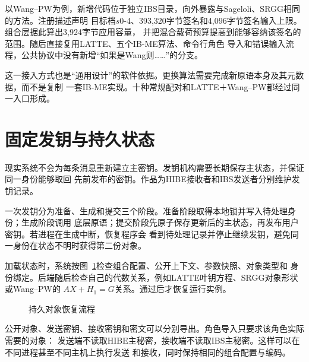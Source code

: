 以Wang--PW为例，新增代码位于独立IBS目录，向外暴露与Sageloli、SRGG相同的方法。注册描述声明
目标档$s0$-4、393,320字节签名和4,096字节签名输入上限。组合层据此算出3,924字节应用容量，
并把混合载荷预算提高到能够容纳该签名的范围。随后直接复用LATTE、五个IB-ME算法、命令行角色
导入和错误输入流程，公共协议中没有新增“如果是Wang则……”的分支。

这一接入方式也是“通用设计”的软件依据。更换算法需要完成新原语本身及其元数据，而不是复制
一套IB-ME实现。十种常规配对和LATTE＋Wang--PW都经过同一入口形成。

\section{固定发钥与持久状态}

现实系统不会为每条消息重新建立主密钥。发钥机构需要长期保存主状态，并保证同一身份能够取回
先前发布的密钥。作品为HIBE接收者和IBS发送者分别维护发钥记录。

一次发钥分为准备、生成和提交三个阶段。准备阶段取得本地锁并写入待处理身份；生成阶段调用
底层原语；提交阶段先原子保存更新后的主状态，再发布用户密钥。若进程在生成中断，恢复程序会
看到待处理记录并停止继续发钥，避免同一身份在状态不明时获得第二份对象。

加载状态时，系统按图~\ref{fig:state-recovery}检查组合配置、公开上下文、参数快照、对象类型和
身份绑定。后端随后检查自己的代数关系，例如LATTE叶钥方程、SRGG对象形状或Wang--PW的
$AX+H_1=G$关系。通过后才恢复运行实例。

\begin{figure}[H]
\centering
{}
\caption{持久对象恢复流程}
\label{fig:state-recovery}
\end{figure}

公开对象、发送密钥、接收密钥和密文可以分别导出。角色导入只要求该角色实际需要的对象：
发送端不读取HIBE主秘密，接收端不读取IBS主秘密。这样可以在不同进程甚至不同主机上执行发送
和接收，同时保持相同的组合配置与编码。

